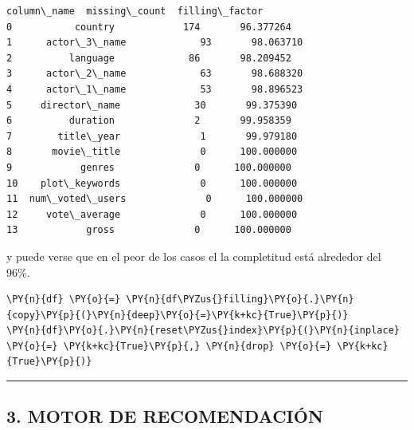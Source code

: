             \begin{tcolorbox}[breakable, boxrule=.5pt, size=fbox, pad at break*=1mm, opacityfill=0]
\begin{Verbatim}[commandchars=\\\{\}]
        column\_name  missing\_count  filling\_factor
0           country            174       96.377264
1      actor\_3\_name             93       98.063710
2          language             86       98.209452
3      actor\_2\_name             63       98.688320
4      actor\_1\_name             53       98.896523
5     director\_name             30       99.375390
6          duration              2       99.958359
7        title\_year              1       99.979180
8       movie\_title              0      100.000000
9            genres              0      100.000000
10    plot\_keywords              0      100.000000
11  num\_voted\_users              0      100.000000
12     vote\_average              0      100.000000
13            gross              0      100.000000
\end{Verbatim}
\end{tcolorbox}
        
    y puede verse que en el peor de los casos el la completitud está
alrededor del 96\%.

    \begin{tcolorbox}[breakable, size=fbox, boxrule=1pt, pad at break*=1mm,colback=cellbackground, colframe=cellborder]
\begin{Verbatim}[commandchars=\\\{\}]
\PY{n}{df} \PY{o}{=} \PY{n}{df\PYZus{}filling}\PY{o}{.}\PY{n}{copy}\PY{p}{(}\PY{n}{deep}\PY{o}{=}\PY{k+kc}{True}\PY{p}{)}
\PY{n}{df}\PY{o}{.}\PY{n}{reset\PYZus{}index}\PY{p}{(}\PY{n}{inplace} \PY{o}{=} \PY{k+kc}{True}\PY{p}{,} \PY{n}{drop} \PY{o}{=} \PY{k+kc}{True}\PY{p}{)}
\end{Verbatim}
\end{tcolorbox}

    \begin{center}\rule{0.5\linewidth}{\linethickness}\end{center}

\subsection{3. MOTOR DE RECOMENDACIÓN}\label{motor-de-recomendaciuxf3n}

